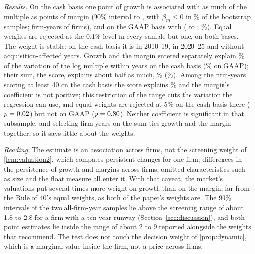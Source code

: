 \emph{Results.} On the cash basis one point of growth is associated with as much of the multiple as \ExWCash{} points of margin (90\% interval \ExWCashLo{} to \ExWCashHi, with $\beta_m\le0$ in \ExWCashBad\% of the bootstrap samples; \ExNCash{} firm-years of \ExFirmsCash{} firms), and on the GAAP basis with \ExWGaap{} (\ExWGaapLo{} to \ExWGaapHi; \ExWGaapBad\%). Equal weights are rejected at the 0.1\% level in every sample but one, on both bases. The weight is stable: on the cash basis it is \ExWEarlyCash{} in 2010--19, \ExWLateCash{} in 2020--25 and \ExWNoAcqCash{} without acquisition-affected years. Growth and the margin entered separately explain \ExRFullCash\% of the variation of the log multiple within years on the cash basis (\ExRFullGaap\% on GAAP); their sum, the score, explains about half as much, \ExRScoreCash\% (\ExRScoreGaap\%). Among the \ExTopN{} firm-years scoring at least 40 on the cash basis the score explains \ExTopRScore\% and the margin's coefficient is not positive; this restriction of the range cuts the variation the regression can use, and equal weights are rejected at 5\% on the cash basis there ($p=0.02$) but not on GAAP ($p=0.80$). Neither coefficient is significant in that subsample, and selecting firm-years on the sum ties growth and the margin together, so it says little about the weights.

\emph{Reading.} The estimate is an association across firms, not the screening weight of \autoref{lem:valuation2}, which compares persistent changes for one firm; differences in the persistence of growth and margins across firms, omitted characteristics such as size and the float measure all enter it. With that caveat, the market's valuations put several times more weight on growth than on the margin, far from the Rule of 40's equal weights, as both of the paper's weights are. The 90\% intervals of the two all-firm-year samples lie above the screening range of about 1.8 to 2.8 for a firm with a ten-year runway (Section~\ref{sec:discussion}), and both point estimates lie inside the range of about 2 to 9 reported alongside the weights that \citet{bessemer2024rulex} recommend. The test does not touch the decision weight of \autoref{prop:dynamic}, which is a marginal value inside the firm, not a price across firms.

